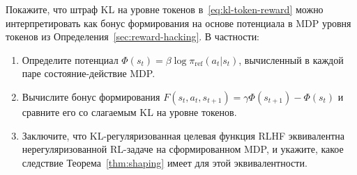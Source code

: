 \begin{exercise}
\label{ex:potential-kl}
Покажите, что штраф KL на уровне токенов в~\eqref{eq:kl-token-reward} можно интерпретировать как бонус формирования на основе потенциала в MDP уровня токенов из Определения~\ref{sec:reward-hacking}. В частности:
\begin{enumerate}
  \item Определите потенциал $\Phi(s_t) = \beta\log\pi_{\mathrm{ref}}(a_t | s_t)$, вычисленный в каждой паре состояние-действие MDP.
  \item Вычислите бонус формирования $F(s_t, a_t, s_{t+1}) = \gamma\Phi(s_{t+1}) - \Phi(s_t)$ и сравните его со слагаемым KL на уровне токенов.
  \item Заключите, что KL-регуляризованная целевая функция RLHF эквивалентна нерегуляризованной RL-задаче на сформированном MDP, и укажите, какое следствие Теорема~\ref{thm:shaping} имеет для этой эквивалентности.
\end{enumerate}
\end{exercise}
